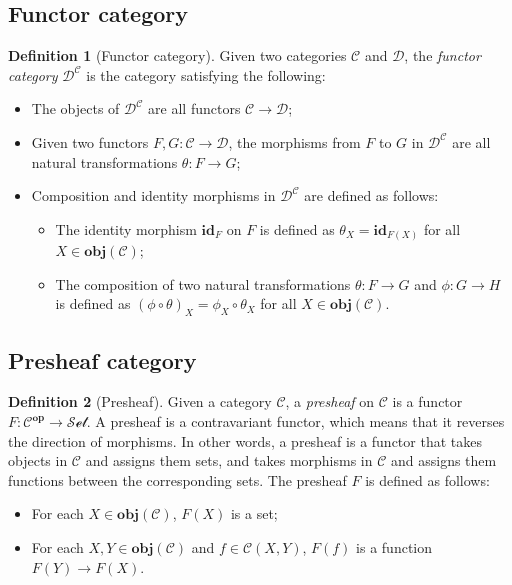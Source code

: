 \documentclass[12pt,twoside,a4paper]{report}
\theoremstyle{definition}
\newtheorem{definition}{Definition}
\theoremstyle{definition}
\theoremstyle{definition}
\theoremstyle{definition}
\begin{document}
        \subsection{Functor category}
        \begin{definition}[Functor category]
            Given two categories $\mathcal{C}$ and $\mathcal{D}$, the \emph{functor category} $\mathcal{D}^{\mathcal{C}}$ is the category satisfying the following:
            \begin{itemize}
                \item 
                    The objects of $\mathcal{D}^{\mathcal{C}}$ are all functors $\mathcal{C} \to \mathcal{D}$;
                \item 
                    Given two functors $F,G: \mathcal{C} \to \mathcal{D}$, the morphisms from $F$ to $G$ in $\mathcal{D}^{\mathcal{C}}$ are all natural transformations $\theta : F \to G$;
                \item
                    Composition and identity morphisms in $\mathcal{D}^{\mathcal{C}}$ are defined as follows:
                    \begin{itemize}
                        \item 
                            The identity morphism $\textbf{id}_F$ on $F$ is defined as $\theta_X = \textbf{id}_{F(X)}$ for all $X \in \textbf{obj}(\mathcal{C})$;
                        \item
                            The composition of two natural transformations $\theta : F \to G$ and $\phi : G \to H$ is defined as $(\phi \circ \theta)_X = \phi_X \circ \theta_X$ for all $X \in \textbf{obj}(\mathcal{C})$.
                    \end{itemize}
            \end{itemize}
        \end{definition}

        \subsection{Presheaf category}
        \begin{definition}[Presheaf]
            Given a category $\mathcal{C}$, a \emph{presheaf} on $\mathcal{C}$ is a functor $F: \mathcal{C}^{\textbf{op}} \to \mathcal{Set}$.
            A presheaf is a contravariant functor, which means that it reverses the direction of morphisms.
            In other words, a presheaf is a functor that takes objects in $\mathcal{C}$ and assigns them sets, and takes morphisms in $\mathcal{C}$ and assigns them functions between the corresponding sets.
            The presheaf $F$ is defined as follows:
            \begin{itemize}
                \item 
                    For each $X \in \textbf{obj}(\mathcal{C})$, $F(X)$ is a set;
                \item
                    For each $X, Y \in \textbf{obj}(\mathcal{C})$ and $f \in \mathcal{C}{(X,Y)}$, $F(f)$ is a function $F(Y) \to F(X)$.
            \end{itemize}
        \end{definition}
\end{document}
